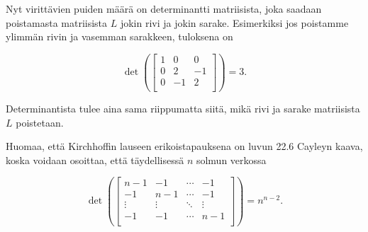 Nyt virittävien puiden määrä on determinantti
matriisista, joka saadaan poistamasta matriisista $L$
jokin rivi ja jokin sarake.
Esimerkiksi jos poistamme ylimmän rivin ja
vasemman sarakkeen, tuloksena on

\[ \det(
\begin{bmatrix}
  1 & 0 & 0 \\
  0 & 2 & -1 \\
  0 & -1 & 2 \\
 \end{bmatrix}
) =3.\]

Determinantista tulee aina sama riippumatta siitä,
mikä rivi ja sarake matriisista $L$ poistetaan.

Huomaa, että Kirchhoffin lauseen erikoistapauksena on
luvun 22.6 Cayleyn kaava, koska voidaan osoittaa, että
täydellisessä $n$ solmun verkossa

\[ \det(
\begin{bmatrix}
  n-1 & -1 & \cdots & -1 \\
  -1 & n-1 & \cdots & -1 \\
  \vdots & \vdots & \ddots & \vdots \\
  -1 & -1 & \cdots & n-1 \\
 \end{bmatrix}
) =n^{n-2}.\]

